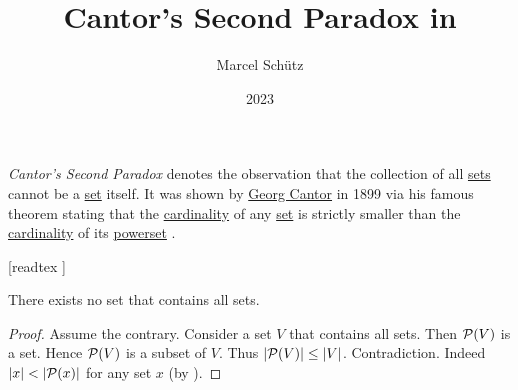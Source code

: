 \documentclass[english]{article}
\begin{document}
\title{Cantor's Second Paradox in \Naproche}
\author{Marcel Schütz}
\date{2023}
\maketitle

\noindent \emph{Cantor's Second Paradox} denotes the observation that the collection of all \href{https://en.wikipedia.org/wiki/Set_(mathematics)}{sets} cannot be a \href{https://en.wikipedia.org/wiki/Set_(mathematics)}{set} itself.
It was shown by \href{https://en.wikipedia.org/wiki/Georg_Cantor}{Georg Cantor} in 1899 via his famous theorem stating that the \href{https://en.wikipedia.org/wiki/Cardinality}{cardinality} of any \href{https://en.wikipedia.org/wiki/Set_(mathematics)}{set} is strictly smaller than the \href{https://en.wikipedia.org/wiki/Cardinality}{cardinality} of its \href{https://en.wikipedia.org/wiki/Power_set}{powerset} \cite[chapter 163]{Cantor1991}.

\begin{forthel}
  [readtex ]

  \begin{theorem*}\label{cantor_paradox_2}
    There exists no set that contains all sets.
  \end{theorem*}
  \begin{proof}
    Assume the contrary.
    Consider a set $V$ that contains all sets.
    Then $\mathcal{P}(V)$ is a set.
    Hence $\mathcal{P}(V)$ is a subset of $V$.
    Thus $|\mathcal{P}(V)| \leq |V|$.
    Contradiction.
    Indeed $|x| < |\mathcal{P}(x)|$ for any set $x$ (by ).
  \end{proof}
\end{forthel}

\printbibliography
\vfill
\doclicenseThis
\end{document}
